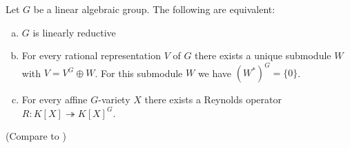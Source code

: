 
\begin{theorem}\label{equiv}
  Let $G$ be a linear algebraic group.
  The following are equivalent:
  \begin{enumerate}[(a)]
  \item $G$ is linearly reductive
  \item For every rational representation $V$ of $G$ there exists a unique submodule $W$ with $V = V^G \oplus W$.
    For this submodule $W$ we have $(W^\ast)^G = \{0\}$.
  \item For every affine $G$-variety $X$ there exists a Reynolds operator \linebreak$R \colon K[X] \twoheadrightarrow K[X]^G $.
  \end{enumerate}
  (Compare to \cite[2.2.5]{DK15})
\end{theorem}

